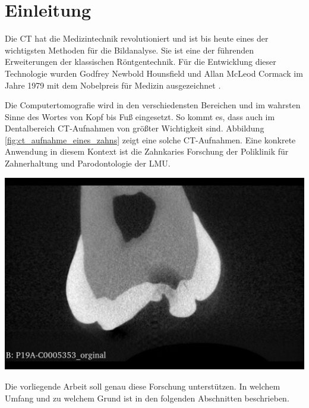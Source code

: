 \chapter{Einleitung}
\label{chap:einleitung} Die \ac{CT} hat die Medizintechnik revolutioniert und
ist bis heute eines der wichtigsten Methoden für die Bildanalyse. Sie ist eine der
führenden Erweiterungen der klassischen Röntgentechnik. Für die Entwicklung
dieser Technologie wurden Godfrey Newbold Hounsfield und Allan McLeod Cormack im
Jahre 1979 mit dem Nobelpreis für Medizin ausgezeichnet \citep[.vgl][S.~12]{handels2000}.

\begin{minipage}{0.45\textwidth}
	Die Computertomografie wird in den verschiedensten Bereichen und im wahrsten Sinne
	des Wortes von Kopf bis Fuß eingesetzt. So kommt es, dass auch im Dentalbereich
	\ac{CT}-Aufnahmen von größter Wichtigkeit sind. Abbildung \ref{fig:ct_aufnahme_eines_zahns}
	zeigt eine solche \ac{CT}-Aufnahmen. Eine konkrete Anwendung in diesem Kontext
	ist die Zahnkaries Forschung der Poliklinik für Zahnerhaltung und Parodontologie
	der \ac{LMU}.
\end{minipage}
\hfill
\begin{minipage}{0.45\textwidth}
	\centering
	\includegraphics[scale=0.2, width=\textwidth]{img/micro_ct_orginal.jpg}
	 \label{fig:ct_aufnahme_eines_zahns}
\end{minipage}

Die vorliegende Arbeit soll genau diese Forschung unterstützen. In welchem Umfang
und zu welchem Grund ist in den folgenden Abschnitten beschrieben.

